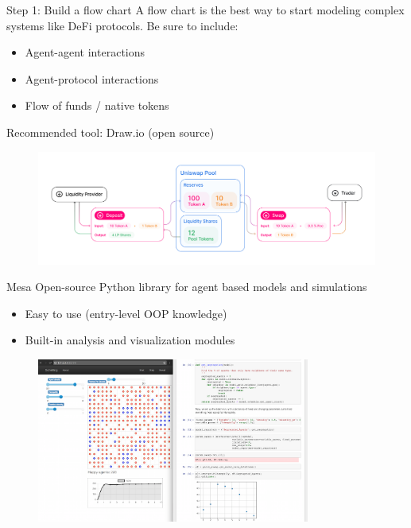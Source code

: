 \documentclass{beamer}
\begin{document}
\begin{frame}{Step 1: Build a flow chart}
    A flow chart is the best way to start modeling complex systems like DeFi protocols. Be sure to include:
    \begin{itemize}
        \item Agent-agent interactions
        \item Agent-protocol interactions
        \item Flow of funds / native tokens
    \end{itemize}
    Recommended tool: Draw.io (open source)\\
    \begin{figure}
        \centering
        \includegraphics[width=\textwidth]{figures/uni_flowchart.jpg}
    \end{figure}
\end{frame}

\begin{frame}{Mesa}
    Open-source Python library for agent based models and simulations\\
    \begin{itemize}
        \item Easy to use (entry-level OOP knowledge)
        \item Built-in analysis and visualization modules
    \end{itemize}
    \begin{figure}
        \centering
        \includegraphics[width=0.8\textwidth]{figures/Mesa_Screenshot.png}
    \end{figure}
\end{frame}
\end{document}
